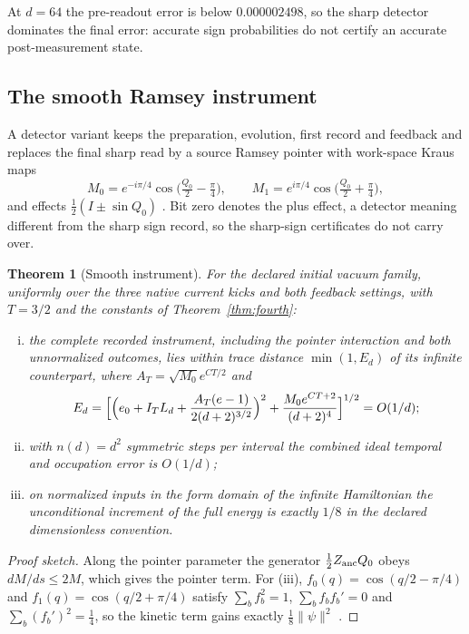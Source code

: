 \documentclass[11pt]{article}
\newtheorem{theorem}{Theorem}[section]
\theoremstyle{definition}
\theoremstyle{remark}
\theoremstyle{plain}
\begin{document}
At $d=64$ the pre-readout error is below $0.000002498$, so the sharp detector
dominates the final error: accurate sign probabilities do not certify an
accurate post-measurement state.

\subsection{The smooth Ramsey instrument}
\label{sec:smooth}

A detector variant keeps the preparation, evolution, first record and
feedback and replaces the final sharp read by a source Ramsey pointer with
work-space Kraus maps
\[
M_0=e^{-i\pi/4}\cos\bigl(\tfrac{Q_0}2-\tfrac\pi4\bigr),\qquad
M_1=e^{i\pi/4}\cos\bigl(\tfrac{Q_0}2+\tfrac\pi4\bigr),
\]
and effects $\frac12(I\pm\sin Q_0)$ \cite{csSMOOTH}. Bit zero denotes the plus
effect, a detector meaning different from the sharp sign record, so the
sharp-sign certificates do not carry over.

\begin{theorem}[Smooth instrument]
\label{thm:smooth}
For the declared initial vacuum family, uniformly over the three native
current kicks and both feedback settings, with $T=3/2$ and the constants of
Theorem~\ref{thm:fourth}:
\begin{enumerate}[(i)]
\item the complete recorded instrument, including the pointer interaction and
both unnormalized outcomes, lies within trace distance $\min(1,E_d)$ of its
infinite counterpart, where $A_T=\sqrt{M_0}e^{CT/2}$ and
\[
E_d=\Bigl[\Bigl(e_0+I_TL_d+\frac{A_T(e-1)}{2(d+2)^{3/2}}\Bigr)^2
+\frac{M_0e^{CT+2}}{(d+2)^4}\Bigr]^{1/2}=O(1/d);
\]
\item with $n(d)=d^2$ symmetric steps per interval the combined ideal temporal
and occupation error is $O(1/d)$;
\item on normalized inputs in the form domain of the infinite Hamiltonian the
unconditional increment of the full energy is exactly $1/8$ in the declared
dimensionless convention.
\end{enumerate}
\end{theorem}

\begin{proof}[Proof sketch]
Along the pointer parameter the generator $\frac12Z_{\rm anc}Q_0$ obeys
$dM/ds\le2M$, which gives the pointer term. For (iii), $f_0(q)=\cos(q/2-\pi/4)$
and $f_1(q)=\cos(q/2+\pi/4)$ satisfy $\sum_bf_b^2=1$, $\sum_bf_bf_b'=0$ and
$\sum_b(f_b')^2=\frac14$, so the kinetic term gains exactly
$\frac18\lVert\psi\rVert^2$ \cite{csSMOOTH}.
\end{proof}
\end{document}
